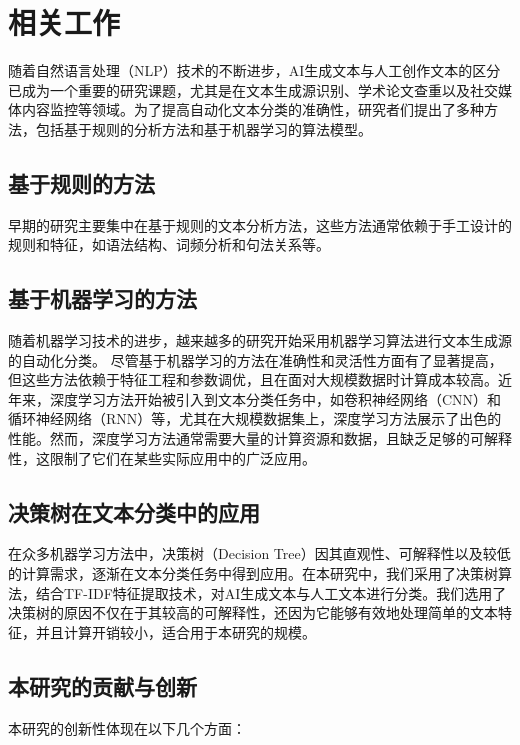 \documentclass[UTF8]{ctexart}
\begin{document}
\section{相关工作}

随着自然语言处理（NLP）技术的不断进步，AI生成文本与人工创作文本的区分已成为一个重要的研究课题，尤其是在文本生成源识别、学术论文查重以及社交媒体内容监控等领域。为了提高自动化文本分类的准确性，研究者们提出了多种方法，包括基于规则的分析方法和基于机器学习的算法模型。

\subsection{基于规则的方法}

早期的研究主要集中在基于规则的文本分析方法，这些方法通常依赖于手工设计的规则和特征，如语法结构、词频分析和句法关系等。

\subsection{基于机器学习的方法}

随着机器学习技术的进步，越来越多的研究开始采用机器学习算法进行文本生成源的自动化分类。
尽管基于机器学习的方法在准确性和灵活性方面有了显著提高，但这些方法依赖于特征工程和参数调优，且在面对大规模数据时计算成本较高。近年来，深度学习方法开始被引入到文本分类任务中，如卷积神经网络（CNN）和循环神经网络（RNN）等，尤其在大规模数据集上，深度学习方法展示了出色的性能。然而，深度学习方法通常需要大量的计算资源和数据，且缺乏足够的可解释性，这限制了它们在某些实际应用中的广泛应用。

\subsection{决策树在文本分类中的应用}

在众多机器学习方法中，决策树（Decision Tree）因其直观性、可解释性以及较低的计算需求，逐渐在文本分类任务中得到应用。在本研究中，我们采用了决策树算法，结合TF-IDF特征提取技术，对AI生成文本与人工文本进行分类。我们选用了决策树的原因不仅在于其较高的可解释性，还因为它能够有效地处理简单的文本特征，并且计算开销较小，适合用于本研究的规模。

\subsection{本研究的贡献与创新}

本研究的创新性体现在以下几个方面：
\end{document}
